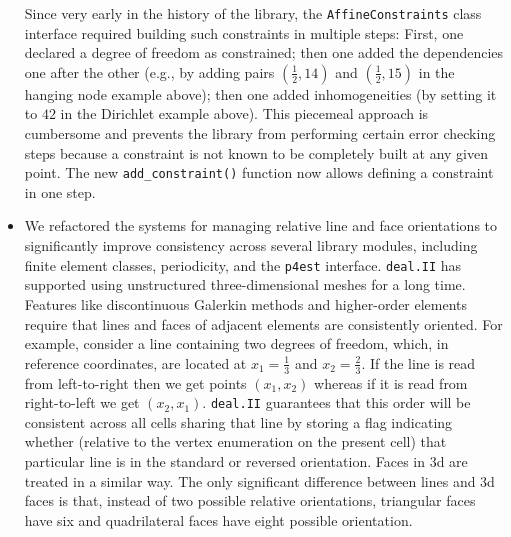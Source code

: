 \documentclass{ansarticle-preprint}
\newcommand{\specialword}[1]{\texttt{#1}}
\newcommand{\dealii}{{\specialword{deal.II}}\xspace}
\newcommand{\pfrst}{{\specialword{p4est}}\xspace}
\begin{document}
\begin{itemize}
    Since very early in the history of the library, the
    \texttt{AffineConstraints} class interface required building such
    constraints in multiple steps: First, one declared a degree of
    freedom as constrained; then one added the dependencies one after
    the other (e.g., by adding pairs $(\frac 12, 14)$ and $(\frac 12,
    15)$ in the hanging node example above); then one added
    inhomogeneities (by setting it to $42$ in the Dirichlet example
    above). This piecemeal approach is cumbersome and prevents the
    library from performing certain error checking steps because a
    constraint is not known to be completely built at any given point. The new
    \texttt{add\_constraint()} function now allows defining a
    constraint in one step.
  \item We refactored the systems for managing relative line and face
    orientations to significantly improve consistency across several library
    modules, including finite element classes, periodicity, and the
    \pfrst{} interface. \dealii{} has supported using unstructured
    three-dimensional meshes for a long time. Features like discontinuous
    Galerkin methods and higher-order elements require that lines and faces of
    adjacent elements are consistently oriented. For example, consider a line
    containing two degrees of freedom, which, in reference coordinates, are
    located at $x_1 = \frac 1 3$ and $x_2 = \frac 2 3$. If the line is read from
    left-to-right then we get points $(x_1, x_2)$ whereas if it is read from
    right-to-left we get $(x_2, x_1)$. \dealii{} guarantees that this order will
    be consistent across all cells sharing that line by storing a flag
    indicating whether (relative to the vertex enumeration on the present cell)
    that particular line is in the standard or reversed orientation. Faces in 3d
    are treated in a similar way. The only significant difference between lines
    and 3d faces is that, instead of two possible relative orientations,
    triangular faces have six and quadrilateral faces have eight
    possible orientation.


\end{itemize}
\end{document}
